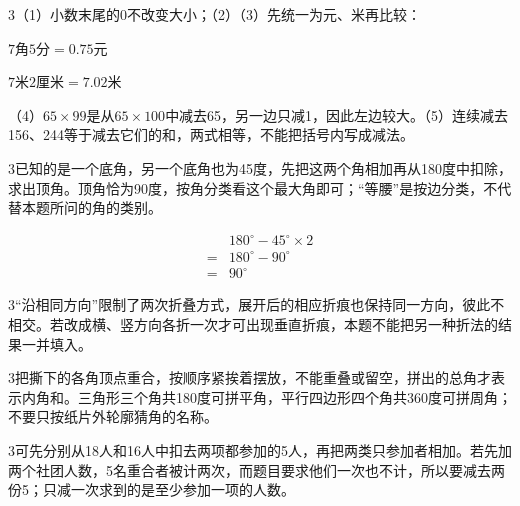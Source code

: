 \documentclass[multi=snippet,border={5bp 20bp 5bp 5bp}]{standalone}
\newenvironment{snippet}[3]{\begin{minipage}{#1bp}\color{answerred}\fontsize{#2}{#3}\selectfont\raggedright}{\end{minipage}}
\begin{document}
\begin{snippet}{505}{11.5}{14}\begin{multicols}{3}\raggedcolumns （1）小数末尾的0不改变大小；（2）（3）先统一为元、米再比较：\par\noindent\(\displaystyle 7\text{角}5\text{分}=0.75\text{元}\)\allowbreak \par \noindent\(\displaystyle 7\text{米}2\text{厘米}=7.02\text{米}\)\allowbreak \par（4）\(65\times99\)\allowbreak 是从\(65\times100\)\allowbreak 中减去65，另一边只减1，因此左边较大。（5）连续减去156、244等于减去它们的和，两式相等，不能把括号内写成减法。\end{multicols}\end{snippet}
\begin{snippet}{505}{11.5}{14}\begin{multicols}{3}\raggedcolumns 已知的是一个底角，另一个底角也为45度，先把这两个角相加再从180度中扣除，求出顶角。顶角恰为90度，按角分类看这个最大角即可；“等腰”是按边分类，不代替本题所问的角的类别。\par \[\begin{aligned}&180^\circ-45^\circ\times2\\={}&180^\circ-90^\circ\\={}&90^\circ\end{aligned}\]\end{multicols}\end{snippet}
\begin{snippet}{505}{11.5}{14}\begin{multicols}{3}\raggedcolumns “沿相同方向”限制了两次折叠方式，展开后的相应折痕也保持同一方向，彼此不相交。若改成横、竖方向各折一次才可出现垂直折痕，本题不能把另一种折法的结果一并填入。\end{multicols}\end{snippet}
\begin{snippet}{505}{11.5}{14}\begin{multicols}{3}\raggedcolumns 把撕下的各角顶点重合，按顺序紧挨着摆放，不能重叠或留空，拼出的总角才表示内角和。三角形三个角共180度可拼平角，平行四边形四个角共360度可拼周角；不要只按纸片外轮廓猜角的名称。\end{multicols}\end{snippet}
\begin{snippet}{505}{11.5}{14}\begin{multicols}{3}\raggedcolumns 可先分别从18人和16人中扣去两项都参加的5人，再把两类只参加者相加。若先加两个社团人数，5名重合者被计两次，而题目要求他们一次也不计，所以要减去两份5；只减一次求到的是至少参加一项的人数。\end{multicols}\end{snippet}
\end{document}
